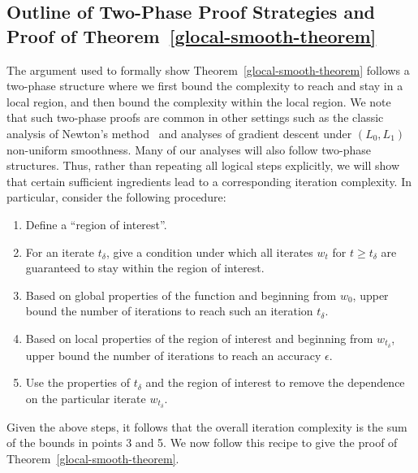 \documentclass[10pt]{article} %
\begin{document}
\subsection{Outline of Two-Phase Proof Strategies and Proof of Theorem~\ref{glocal-smooth-theorem}}
\label{app:recipe}

The argument used to formally show Theorem~\ref{glocal-smooth-theorem} follows a two-phase structure where we first bound the complexity to reach and stay in a local region, and then bound the complexity within the local region. We note that such two-phase proofs are common in other settings such as the classic analysis of Newton's method~\cite[see Chapter~9]{boyd2004} and analyses of gradient descent under $(L_0, L_1)$ non-uniform smoothness. Many of our analyses will also follow two-phase structures.  Thus, rather than repeating all logical steps explicitly, we will show that certain sufficient ingredients lead to a corresponding iteration complexity. In particular, consider the following procedure:
\begin{enumerate}
\item Define a ``region of interest''.
\item For an iterate $t_\delta$, give a condition under which all iterates $w_t$ for $t \geq t_\delta$ are guaranteed to stay within the region of interest. 
\item Based on global properties of the function and beginning from $w_0$, upper bound the number of iterations to reach such an iteration $t_\delta$. 
\item Based on local properties of the region of interest and beginning from $w_{t_\delta}$, upper bound  the number of iterations to reach an accuracy $\epsilon$. 
\item Use the properties of $t_\delta$ and the region of interest to remove the dependence on the particular iterate $w_{t_\delta}$. 
\end{enumerate}
Given the above steps, it follows that the overall iteration complexity is the sum of the bounds in points 3 and 5. We now follow this recipe to give the proof of Theorem~\ref{glocal-smooth-theorem}.
\end{document}
